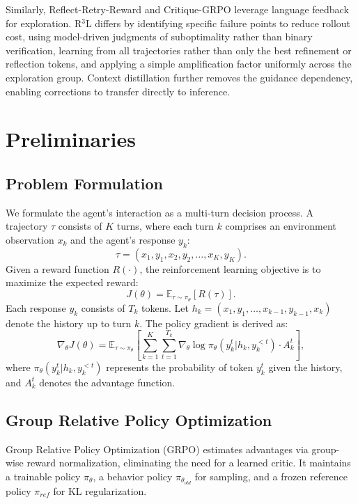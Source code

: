 \documentclass{article} %
\theoremstyle{definition}
\theoremstyle{remark}
\let\cite\citep
\begin{document}
Similarly, Reflect-Retry-Reward \cite{bensal2025reflect} and Critique-GRPO \cite{zhang2025critique} leverage language feedback for exploration. R$^3$L differs by identifying specific failure points to reduce rollout cost, using model-driven judgments of suboptimality rather than binary verification, learning from all trajectories rather than only the best refinement or reflection tokens, and applying a simple amplification factor uniformly across the exploration group. Context distillation further removes the guidance dependency, enabling corrections to transfer directly to inference.

\section{Preliminaries}
\subsection{Problem Formulation}
We formulate the agent's interaction as a multi-turn decision process. A trajectory $\tau$ consists of $K$ turns, where each turn $k$ comprises an environment observation $x_k$ and the agent's response $y_k$:
\begin{equation}
    \tau = (x_1, y_1, x_2, y_2, \ldots, x_K, y_K).
\end{equation}
Given a reward function $R(\cdot)$, the reinforcement learning objective is to maximize the expected reward:
\begin{equation}
    J(\theta) = \mathbb{E}_{\tau \sim \pi_{\theta}} [R(\tau)].
\end{equation}
Each response $y_k$ consists of $T_k$ tokens. Let $h_k = (x_1, y_1, \ldots, x_{k-1}, y_{k-1}, x_k)$ denote the history up to turn $k$. The policy gradient is derived as:
\begin{equation}
    \nabla_{\theta} J(\theta) \!\!=\!\! \mathbb{E}_{\tau \sim \pi_{\theta}} \!\!\left[ \sum_{k=1}^{K} \!\! \sum_{t=1}^{T_k} \!\! \nabla_{\theta} \! \log \pi_{\theta}(y_k^t | h_k, y_k^{<t}) \!\cdot\! A_k^t \! \right]\!,
\end{equation}
where $\pi_{\theta}(y_k^t | h_k, y_k^{<t})$ represents the probability of token $y_k^t$ given the history, and $A_k^t$ denotes the advantage function.

\subsection{Group Relative Policy Optimization}
Group Relative Policy Optimization (GRPO) \cite{shao2024deepseekmath} estimates advantages via group-wise reward normalization, eliminating the need for a learned critic. It maintains a trainable policy $\pi_{\theta}$, a behavior policy $\pi_{\theta_{old}}$ for sampling, and a frozen reference policy $\pi_{ref}$ for KL regularization.
\end{document}
